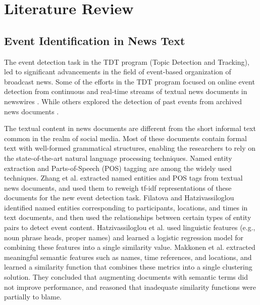
\chapter{Literature Review} %

\label{review} %


\section{Event Identification in News Text}
The event detection task \cite{allan2002topic} in the TDT program (Topic Detection and Tracking), led to significant advancements in the field of event-based organization of broadcast news. Some of the efforts in the TDT program focused on online event detection from continuous and real-time streams of textual news documents in newswires \cite{allan1998line,kumaran2004text}. While others explored the detection of past events from archived news documents \cite{yang1998study}. 

The textual content in news documents are different from the short informal text common in the realm of social media.  Most of these documents contain formal text with well-formed grammatical structures, enabling the researchers to rely on the state-of-the-art natural language processing techniques. Named entity extraction and Parts-of-Speech (POS) tagging are among the widely used techniques. Zhang et al. \cite{zhang2007new} extracted named entities and POS tags from textual news documents, and used them to reweigh tf-idf representations of these documents for the new event detection task. Filatova and Hatzivassiloglou \cite{hatzivassiloglou2003domain} identified named entities corresponding to participants, locations, and times in text documents, and then used the relationships between certain types of entity pairs to detect event content. Hatzivassiloglou et al. \cite{hatzivassiloglou2000investigation} used linguistic features (e.g., noun phrase heads, proper names) and learned a logistic regression model for combining these features into a single similarity value. Makkonen et al. \cite{makkonen2004simple} extracted meaningful semantic features such as names, time references, and locations, and learned a similarity function that combines these metrics into a single clustering solution. They concluded that augmenting documents with semantic terms did not improve performance, and reasoned that inadequate similarity functions were partially to blame. 

